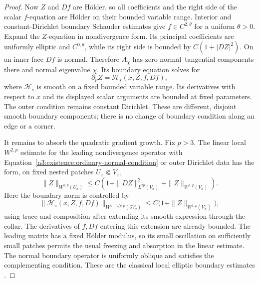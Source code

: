\begin{proof}
Now $Z$ and $Df$ are H\"older, so all coefficients and the right
side of the scalar $f$-equation are H\"older on their bounded
variable range.  Interior and constant-Dirichlet boundary Schauder
estimates give $f\in C^{2,\theta}$ for a uniform $\theta>0$.
Expand the $Z$-equation in nondivergence form.  Its principal
coefficients are uniformly elliptic and $C^{0,\theta}$, while its
right side is bounded by $C(1+|DZ|^2)$.
On an inner face $Df$ is normal.  Therefore $A_\chi$ has zero
normal--tangential components there and normal eigenvalue $\chi$.
Its boundary equation solves for
\begin{equation}\label{n3:existence:ordinary-normal-condition}
 \partial_\nu Z=\mathcal H_s(x,Z,f,Df),
\end{equation}
where $\mathcal H_s$ is smooth on a fixed bounded variable range.
Its derivatives with respect to $x$ and its displayed scalar
arguments are bounded at fixed parameters.  The outer condition
remains constant Dirichlet.  These are different, disjoint smooth
boundary components; there is no change of boundary condition along
an edge or a corner.

It remains to absorb the quadratic gradient growth. Fix
$p>3$.  The linear local $W^{2,p}$ estimate for the leading
nondivergence operator with Equation~\eqref{n3:existence:ordinary-normal-condition}
or outer Dirichlet data has the form, on fixed nested patches
$U_x\Subset V_x$,
\begin{equation}\label{n3:existence:Wp-pre-absorption}
 \|Z\|_{W^{2,p}(U_x)}
 \le C\left(1+\|DZ\|_{L^{2p}(V_x)}^2
                 +\|Z\|_{W^{1,p}(V_x)}\right).
\end{equation}
Here the boundary norm is controlled by
\begin{equation}\label{n3:existence:boundary-trace-composition}
 \|\mathcal H_s(x,Z,f,Df)\|_{W^{1-1/p,p}(\partial V_x)}
 \le C\bigl(1+\|Z\|_{W^{1,p}(V_x^+)}\bigr),
\end{equation}
using trace and composition after extending its smooth expression
through the collar.  The derivatives of $f,Df$ entering this
extension are already bounded.  The leading matrix has a fixed
H\"older modulus, so its small oscillation on sufficiently small
patches permits the usual freezing and absorption in the linear
estimate.  The normal boundary operator is uniformly oblique and
satisfies the complementing condition.  These are the classical
local elliptic boundary estimates
\cite{AgmonDouglisNirenberg1959,AgmonDouglisNirenberg1964}.


\end{proof}
